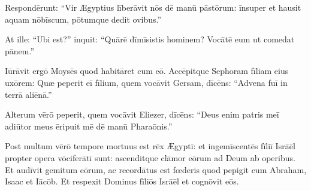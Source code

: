 Respondērunt: ``Vir Ægyptius līberāvit nōs dē manū pāstōrum:
īnsuper et hausit aquam nōbīscum, pōtumque dedit ovibus.''

At ille: ``Ubi est?'' inquit: ``Quārē dīmīsistis hominem? Vocātē eum ut comedat pānem.''

Iūrāvit ergō Moysēs quod habitāret cum eō.
Accēpitque Sephoram fīliam eius uxōrem:
Quæ peperit eī fīlium, quem vocāvit Gersam, dīcēns:
``Advena fuī in terrā aliēnā.''

Alterum vērō peperit, quem vocāvit Eliezer, dīcēns:
``Deus enim patris meī adiūtor meus ēripuit mē dē manū Pharaōnis.''

Post multum vērō tempore mortuus est rēx Ægyptī:
et ingemīscentēs fīliī Isrāēl
propter opera vōciferātī sunt:
ascenditque clāmor eōrum ad Deum ab operibus.
Et audīvit gemitum eōrum,
ac recordātus est fœderis quod pepigit cum Abraham, Isaac et Iācōb.
Et respexit Dominus fīliōs Isrāēl et cognōvit eōs.
